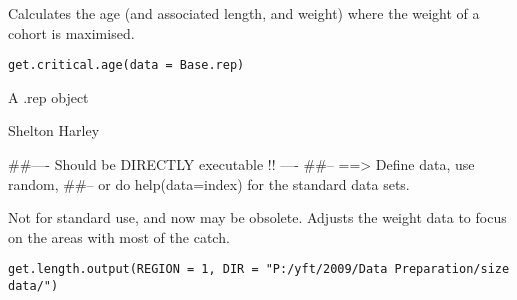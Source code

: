 \documentclass[a4paper]{book}
\begin{document}
%
\begin{Description}\relax

Calculates the age (and associated length, and weight) where the weight of a cohort is maximised. 
\end{Description}
%
\begin{Usage}
\begin{verbatim}
get.critical.age(data = Base.rep)
\end{verbatim}
\end{Usage}
%
\begin{Arguments}
\begin{ldescription}
\item[\code{data}] 

A .rep object

\end{ldescription}
\end{Arguments}
%
\begin{Author}\relax

Shelton Harley
\end{Author}
%
\begin{Examples}
\begin{ExampleCode}
##---- Should be DIRECTLY executable !! ----
##-- ==>  Define data, use random,
##--	or do  help(data=index)  for the standard data sets.

\end{ExampleCode}
\end{Examples}
%
\begin{Description}\relax

Not for standard use, and now may be obsolete. Adjusts the weight data to focus on the areas with most of the catch.
\end{Description}
%
\begin{Usage}
\begin{verbatim}
get.length.output(REGION = 1, DIR = "P:/yft/2009/Data Preparation/size data/")
\end{verbatim}
\end{Usage}
%
\begin{Arguments}
\begin{ldescription}
\item[\code{REGION}] 


\item[\code{DIR}] 


\end{ldescription}
\end{Arguments}
\end{document}
